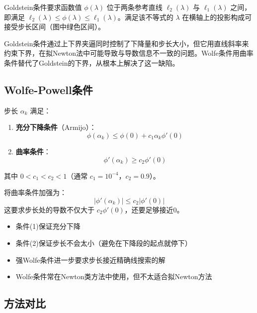 Goldstein条件要求函数值 $\phi(\lambda)$ 位于两条参考直线 $\ell_2(\lambda)$ 与 $\ell_1(\lambda)$ 之间，即满足 $\ell_2(\lambda)\le\phi(\lambda)\le\ell_1(\lambda)$。满足该不等式的 $\lambda$ 在横轴上的投影构成可接受步长区间（图中绿色区间）。

Goldstein条件通过上下界夹逼同时控制了下降量和步长大小，但它用直线斜率来约束下界，在拟Newton法中可能导致与导数信息不一致的问题。Wolfe条件用曲率条件替代了Goldstein的下界，从根本上解决了这一缺陷。

\subsection{Wolfe-Powell条件}

\begin{conceptbox}[Wolfe条件]
步长 $\alpha_k$ 满足：
\begin{enumerate}[label=(\arabic*)]
    \item \textbf{充分下降条件}（Armijo）：
    \[
    \phi(\alpha_k) \leq \phi(0) + c_1 \alpha_k \phi'(0)
    \]
    \item \textbf{曲率条件}：
    \[
    \phi'(\alpha_k) \geq c_2 \phi'(0)
    \]
\end{enumerate}
其中 $0 < c_1 < c_2 < 1$（通常 $c_1 = 10^{-4}$，$c_2 = 0.9$）。
\end{conceptbox}

\begin{conceptbox}[强Wolfe条件]
将曲率条件加强为：
\[
|\phi'(\alpha_k)| \leq c_2 |\phi'(0)|
\]
这要求步长处的导数不仅大于 $c_2 \phi'(0)$，还要足够接近0。
\end{conceptbox}

\begin{notebox}[Wolfe条件的意义]
\begin{itemize}[itemsep=0.3em]
    \item 条件(1)保证充分下降
    \item 条件(2)保证步长不会太小（避免在下降段的起点就停下）
    \item 强Wolfe条件进一步要求步长接近精确线搜索的解
    \item Wolfe条件常在Newton类方法中使用，但不太适合拟Newton方法
\end{itemize}
\end{notebox}

\subsection{方法对比}


